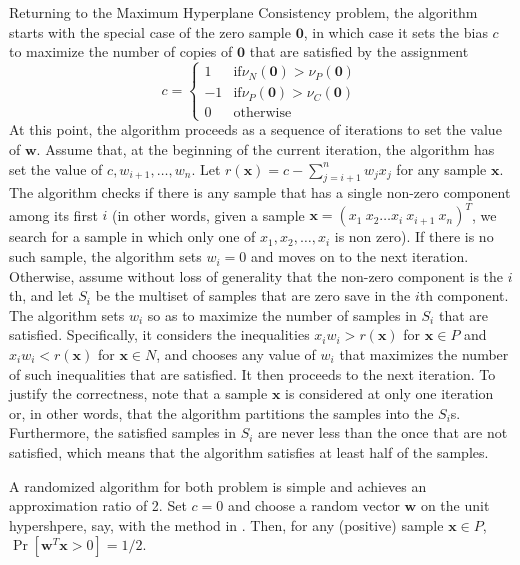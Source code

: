 \documentclass[11pt]{article}
\theoremstyle{definition}
\newcommand{\vect}[1]{\mathbf{#1}}
\begin{document}
Returning to the Maximum Hyperplane Consistency problem,  
the algorithm starts with the special case of the zero sample $\vect{0}$, in which 
case it sets the bias $c$ to maximize the number of copies of $\vect{0}$ that are satisfied by
the assignment 
$$c = \begin{cases} 
1 & \text{if} \nu_N(\vect{0}) > \nu_P(\vect{0})\\
-1 & \text{if} \nu_P(\vect{0}) > \nu_C(\vect{0})\\
0 & \text{otherwise}
\end{cases}$$
At this point, the algorithm proceeds as a sequence of iterations to set the value of $\vect{w}$.
Assume that, at the beginning of the current iteration,
the algorithm has set the value of $c, w_{i+1}, \dots, w_n$.
Let $r(\vect{x}) = c - \sum_{j = i + 1}^n w_j x_j$ for any sample $\vect{x}$.
The algorithm checks if there is any sample that has a single non-zero component among its first $i$
(in other words, given a sample $\vect{x} = (x_1 ~ x_2 \dots x_i ~ x_{i+1} ~ x_n)^T$,
we search for a sample in which only one of $x_1, x_2, \dots , x_i$ is non zero).
If there is no such sample, the algorithm sets $w_i = 0$ and moves on to the next iteration.
Otherwise, assume without loss of generality that the non-zero component is the $i$th,
and let $S_i$ be the multiset of samples that are zero save in the $i$th component. 
The algorithm sets $w_i$ so as to maximize the number of samples in $S_i$ that are satisfied. 
Specifically, it considers the inequalities 
$x_i w_i > r(\vect{x})$ for $\vect{x} \in P$ and 
$x_i w_i < r(\vect{x})$ for $\vect{x} \in N$, and
chooses any value of $w_i$ that maximizes the number of such inequalities that are satisfied. 
It then proceeds to the next iteration.
To justify the correctness, note that a sample $\vect{x}$ is considered at only one iteration or,
in other words, that the algorithm partitions the samples into the $S_i$s.
Furthermore, the satisfied samples in $S_i$ are never less than the once that are not satisfied,
which means that the algorithm satisfies at least half of the samples.

A randomized algorithm for both problem is simple and achieves an approximation ratio of 2. 
Set $c = 0$ and choose a random vector $\vect{w}$ on the unit hypershpere, say, with the
method in \cite{rndvect}. Then, for any (positive) sample $\vect{x} \in P$,
$\Pr [ \vect{w}^T \vect{x} > 0 ] = 1 / 2$.



\end{document}
